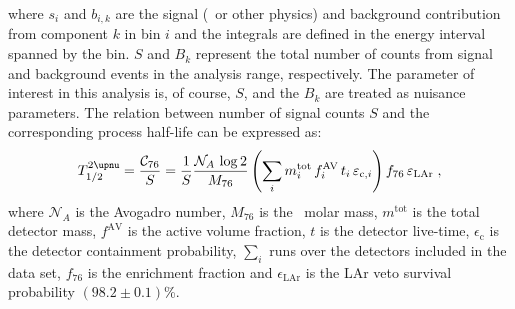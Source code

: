 where $s_i$ and $b_{i,k}$ are the signal (\nnbb\ or other physics) and background
contribution from component $k$ in bin $i$ and the integrals are defined in the energy
interval spanned by the bin. $S$ and $B_k$ represent the total number of counts from
signal and background events in the analysis range, respectively. The parameter of
interest in this analysis is, of course, $S$, and the $B_k$ are treated as nuisance
parameters. The relation between number of signal counts $S$ and the corresponding process
half-life can be expressed as:
\begin{equation}\label{eq:2nbb-ana:halflife}
  \thalftwoM = \frac{\mathcal{C}_{76}}{S} = \frac{1}{S} \frac{\mathcal{N}_A\, \log2}{M_{76}}
               \left( \sum_i m^\text{tot}_i \, f^\text{AV}_i \, t_i \, \epsilon_{\text{c},i} \right)
               f_{76} \, \epsilon_\text{LAr} \;,
\end{equation}
where $\mathcal{N}_A$ is the Avogadro number, $M_{76}$ is the \gesix\ molar mass,
$m^\text{tot}$ is the total detector mass, $f^\text{AV}$ is the active volume fraction,
$t$ is the detector live-time, $\epsilon_\text{c}$ is the detector containment
probability, $\sum_i$ runs over the detectors included in the data set, $f_{76}$ is the
enrichment fraction and $\epsilon_\text{LAr}$ is the LAr veto survival probability $(98.2
\pm 0.1)$\%.

